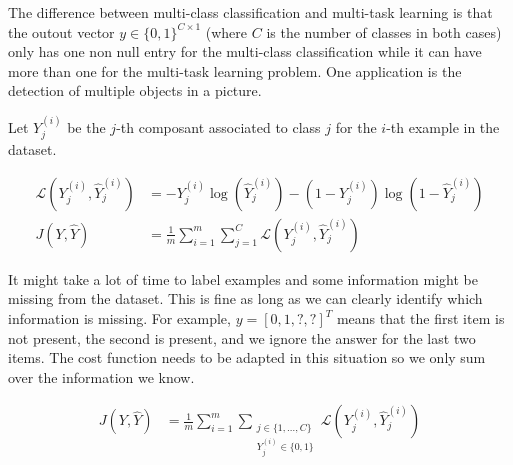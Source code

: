 The difference between multi-class classification and multi-task learning is that the outout vector $y\in\{0,1\}^{C\times1}$
(where $C$ is the number of classes in both cases) only has one non null entry for the multi-class classification
while it can have more than one for the multi-task learning problem.
One application is the detection of multiple objects in a picture.

Let $Y^{(i)}_j$ be the $j$-th composant associated to class $j$ for the $i$-th example in the dataset.

\begin{align}
	\mathcal{L}(Y^{(i)}_j,\hat{Y}^{(i)}_j) &= -Y^{(i)}_j \log(\hat{Y}^{(i)}_j) - (1-Y^{(i)}_j) \log(1 - \hat{Y}^{(i)}_j) \\
	J(Y,\hat{Y}) &= \frac{1}{m} \sum_{i=1}^{m} \sum_{j=1}^{C} \mathcal{L}(Y^{(i)}_j,\hat{Y}^{(i)}_j)
\end{align}

It might take a lot of time to label examples and some information might be missing from the dataset.
This is fine as long as we can clearly identify which information is missing.
For example, $y = [0, 1, ?, ?]^T$ means that the first item is not present, the second is present, 
and we ignore the answer for the last two items.
The cost function needs to be adapted in this situation so we only sum over the information we know.

\begin{align}
J(Y,\hat{Y}) &= \frac{1}{m} \sum_{i=1}^{m} \sum_{
	\substack{ j\in\{1,\dots,C\}\\ Y^{(i)}_j\in\{0,1\} }
	} \mathcal{L}(Y^{(i)}_j,\hat{Y}^{(i)}_j)
\end{align}
